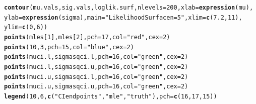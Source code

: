 \documentclass[12pt]{article}\usepackage[]{graphicx}\usepackage[]{color}
\makeatletter
\newcommand{\hlnum}[1]{\textcolor[rgb]{0.686,0.059,0.569}{#1}}%
\newcommand{\hlstr}[1]{\textcolor[rgb]{0.192,0.494,0.8}{#1}}%
\newcommand{\hlstd}[1]{\textcolor[rgb]{0.345,0.345,0.345}{#1}}%
\newcommand{\hlkwc}[1]{\textcolor[rgb]{0.333,0.667,0.333}{#1}}%
\newcommand{\hlkwd}[1]{\textcolor[rgb]{0.737,0.353,0.396}{\textbf{#1}}}%
\newenvironment{kframe}{%
 \def\at@end@of@kframe{}%
 \ifinner\ifhmode%
  \def\at@end@of@kframe{\end{minipage}}%
  \begin{minipage}{\columnwidth}%
 \fi\fi%
 \def\FrameCommand##1{\hskip\@totalleftmargin \hskip-\fboxsep
 \colorbox{shadecolor}{##1}\hskip-\fboxsep
     \hskip-\linewidth \hskip-\@totalleftmargin \hskip\columnwidth}%
 \MakeFramed {\advance\hsize-\width
   \@totalleftmargin\z@ \linewidth\hsize
   \@setminipage}}%
 {\par\unskip\endMakeFramed%
 \at@end@of@kframe}
\newenvironment{knitrout}{}{} %
\makeatother
\begin{document}
\begin{knitrout}
\begin{kframe}
\begin{alltt}
\hlkwd{contour}\hlstd{(mu.vals, sig.vals, loglik.surf,} \hlkwc{nlevels} \hlstd{=} \hlnum{200}\hlstd{,} \hlkwc{xlab} \hlstd{=} \hlkwd{expression}\hlstd{(mu),}
        \hlkwc{ylab} \hlstd{=} \hlkwd{expression}\hlstd{(sigma),} \hlkwc{main}\hlstd{=}\hlstr{"Likelihood Surface n=5"}\hlstd{,} \hlkwc{xlim}\hlstd{=}\hlkwd{c}\hlstd{(}\hlnum{7.2}\hlstd{,}\hlnum{11}\hlstd{),}
        \hlkwc{ylim}\hlstd{=}\hlkwd{c}\hlstd{(}\hlnum{0}\hlstd{,}\hlnum{6}\hlstd{))}
  \hlkwd{points}\hlstd{(mles[}\hlnum{1}\hlstd{], mles[}\hlnum{2}\hlstd{],} \hlkwc{pch}\hlstd{=}\hlnum{17}\hlstd{,} \hlkwc{col}\hlstd{=}\hlstr{"red"}\hlstd{,} \hlkwc{cex}\hlstd{=}\hlnum{2}\hlstd{)}
  \hlkwd{points}\hlstd{(}\hlnum{10}\hlstd{,} \hlnum{3}\hlstd{,} \hlkwc{pch}\hlstd{=}\hlnum{15}\hlstd{,} \hlkwc{col}\hlstd{=}\hlstr{"blue"}\hlstd{,} \hlkwc{cex}\hlstd{=}\hlnum{2}\hlstd{)}
  \hlkwd{points}\hlstd{(muci.l, sigmasqci.l,} \hlkwc{pch}\hlstd{=}\hlnum{16}\hlstd{,} \hlkwc{col}\hlstd{=}\hlstr{"green"}\hlstd{,} \hlkwc{cex}\hlstd{=}\hlnum{2}\hlstd{)}
  \hlkwd{points}\hlstd{(muci.l, sigmasqci.u,} \hlkwc{pch}\hlstd{=}\hlnum{16}\hlstd{,} \hlkwc{col}\hlstd{=}\hlstr{"green"}\hlstd{,} \hlkwc{cex}\hlstd{=}\hlnum{2}\hlstd{)}
  \hlkwd{points}\hlstd{(muci.u, sigmasqci.l,} \hlkwc{pch}\hlstd{=}\hlnum{16}\hlstd{,} \hlkwc{col}\hlstd{=}\hlstr{"green"}\hlstd{,} \hlkwc{cex}\hlstd{=}\hlnum{2}\hlstd{)}
  \hlkwd{points}\hlstd{(muci.u, sigmasqci.u,} \hlkwc{pch}\hlstd{=}\hlnum{16}\hlstd{,} \hlkwc{col}\hlstd{=}\hlstr{"green"}\hlstd{,} \hlkwc{cex}\hlstd{=}\hlnum{2}\hlstd{)}
  \hlkwd{legend}\hlstd{(}\hlnum{10}\hlstd{,}\hlnum{6}\hlstd{,} \hlkwd{c}\hlstd{(}\hlstr{"CI endpoints"}\hlstd{,} \hlstr{"mle"}\hlstd{,} \hlstr{"truth"}\hlstd{),} \hlkwc{pch}\hlstd{=}\hlkwd{c}\hlstd{(}\hlnum{16}\hlstd{,} \hlnum{17}\hlstd{,} \hlnum{15}\hlstd{))}
\end{alltt}
\end{kframe}
\end{knitrout}
\end{document}
